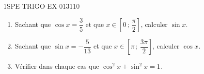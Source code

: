 \begin{exercice}{1SPE-TRIGO-EX-013}{1}{10}
\begin{enumerate}
  \item Sachant que $\cos x = \dfrac{3}{5}$ et que $x \in \left[0\,;\,\dfrac{\pi}{2}\right]$, calculer $\sin x$.
  \item Sachant que $\sin x = -\dfrac{5}{13}$ et que $x \in \left[\pi\,;\,\dfrac{3\pi}{2}\right]$, calculer $\cos x$.
  \item Vérifier dans chaque cas que $\cos^2 x + \sin^2 x = 1$.
\end{enumerate}
\end{exercice}
